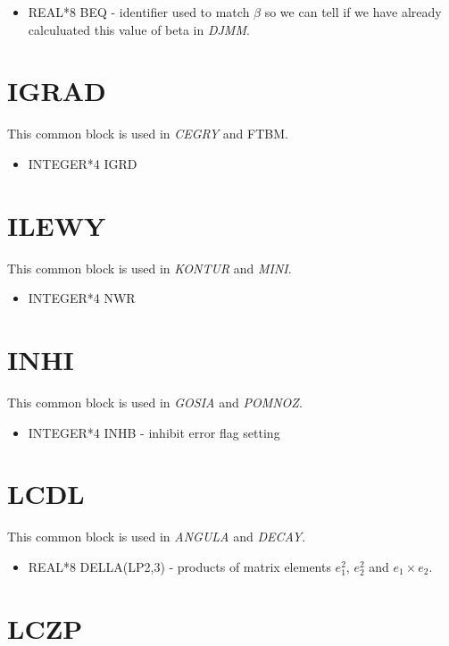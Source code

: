 \begin{itemize}
\item REAL*8 BEQ - identifier used to match $\beta$ so we can tell if we
have already calculuated this value of beta in \emph{DJMM}.
\end{itemize}

\section{IGRAD}

This common block is used in \emph{CEGRY} and {FTBM}.

\begin{itemize}
\item INTEGER*4 IGRD
\end{itemize}

\section{ILEWY}

This common block is used in \emph{KONTUR} and \emph{MINI}.

\begin{itemize}
\item INTEGER*4 NWR
\end{itemize}

\section{INHI}

This common block is used in \emph{GOSIA} and \emph{POMNOZ}.

\begin{itemize}
\item INTEGER*4 INHB - inhibit error flag setting
\end{itemize}


\section{LCDL}

This common block is used in \emph{ANGULA} and \emph{DECAY}.

\begin{itemize}
\item REAL*8 DELLA(LP2,3) - products of matrix elements $e_1^2$, $e_2^2$ and
$e_1 \times e_2$.
\end{itemize}

\section{LCZP}


